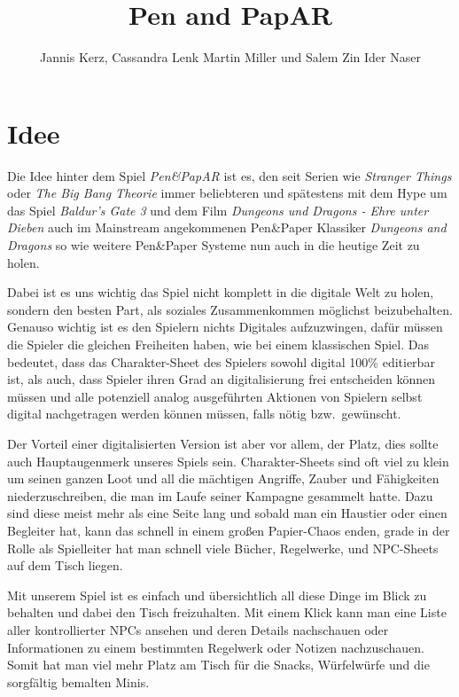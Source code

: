 \documentclass[11pt]{article}
\begin{document}
    \title{Pen and PapAR}
    \author{Jannis Kerz, Cassandra Lenk Martin Miller und Salem Zin Ider Naser}

    \maketitle
    \newpage

    \tableofcontents
    \newpage

    \section{Idee}\label{sec:chapter_idea}

    Die Idee hinter dem Spiel \textit{Pen\&PapAR} ist es, den seit Serien wie
    \textit{Stranger Things} oder \textit{The Big Bang Theorie} immer beliebteren und
    spätestens mit dem Hype um das Spiel \textit{Baldur's Gate 3} und dem Film
    \textit{Dungeons und Dragons - Ehre unter Dieben} auch im Mainstream angekommenen
    Pen\&Paper Klassiker \textit{Dungeons and Dragons} so wie weitere Pen\&Paper Systeme nun
    auch in die heutige Zeit zu holen.\newblock

    Dabei ist es uns wichtig das Spiel nicht komplett in die digitale Welt zu holen, sondern
    den besten Part, als soziales Zusammenkommen möglichst beizubehalten.
    Genauso wichtig ist es den Spielern nichts Digitales aufzuzwingen, dafür müssen
    die Spieler die gleichen Freiheiten haben, wie bei einem klassischen Spiel.
    Das bedeutet, dass das Charakter-Sheet des Spielers sowohl digital 100\% editierbar ist,
    als auch, dass Spieler ihren Grad an digitalisierung frei entscheiden können müssen und
    alle potenziell analog ausgeführten Aktionen von Spielern selbst digital nachgetragen werden
    können müssen, falls nötig bzw.\ gewünscht.\newblock

    Der Vorteil einer digitalisierten Version ist aber vor allem, der Platz, dies sollte auch
    Hauptaugenmerk unseres Spiels sein.
    Charakter-Sheets sind oft viel zu klein um seinen ganzen Loot und all die mächtigen Angriffe,
    Zauber und Fähigkeiten niederzuschreiben, die man im Laufe seiner Kampagne gesammelt hatte.
    Dazu sind diese meist mehr als eine Seite lang und sobald man ein Haustier oder einen Begleiter
    hat, kann das schnell in einem großen Papier-Chaos enden, grade in der Rolle als Spielleiter
    hat man schnell viele Bücher, Regelwerke, und NPC-Sheets auf dem Tisch liegen.\n

    Mit unserem Spiel ist es einfach und übersichtlich all diese Dinge im Blick zu behalten und
    dabei den Tisch freizuhalten.
    Mit einem Klick kann man eine Liste aller kontrollierter NPCs
    ansehen und deren Details nachschauen oder Informationen zu einem bestimmten Regelwerk oder Notizen
    nachzuschauen.
    Somit hat man viel mehr Platz am Tisch für die Snacks, Würfelwürfe und die sorgfältig bemalten
    Minis.\newblock
\end{document}
